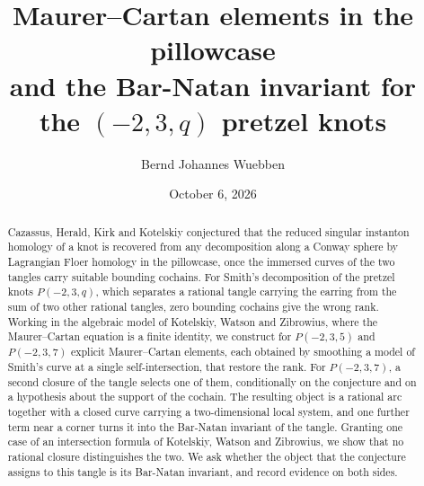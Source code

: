 \documentclass[11pt,reqno]{amsart}
\theoremstyle{plain}
\theoremstyle{definition}
\numberwithin{equation}{section}
\begin{document}
\title[Maurer--Cartan elements and the Bar-Natan invariant]
{Maurer--Cartan elements in the pillowcase\\ and the Bar-Natan invariant for the $(-2,3,q)$ pretzel knots}

\author{Bernd Johannes Wuebben}
\date{October 6, 2026}

\begin{abstract}
Cazassus, Herald, Kirk and Kotelskiy conjectured that the reduced singular instanton homology of a knot is
recovered from any decomposition along a Conway sphere by Lagrangian Floer homology in the pillowcase, once the
immersed curves of the two tangles carry suitable bounding cochains. For Smith's decomposition of the pretzel knots
$P(-2,3,q)$, which separates a rational tangle carrying the earring from the sum of two other rational tangles,
zero bounding cochains give the wrong rank. Working in the
algebraic model of Kotelskiy, Watson and Zibrowius, where the Maurer--Cartan equation is a finite identity, we
construct for $P(-2,3,5)$ and $P(-2,3,7)$ explicit Maurer--Cartan elements, each obtained by smoothing a model of
Smith's curve at a single self-intersection, that restore the rank. For $P(-2,3,7)$, a second closure of the tangle
selects one of them, conditionally on the conjecture and on a hypothesis about the support of the cochain. The
resulting object is a rational arc together with a closed curve carrying a two-dimensional local system, and one
further term near a corner turns it into the Bar-Natan invariant of the tangle. Granting one case of an
intersection formula of Kotelskiy, Watson and Zibrowius, we show that no rational closure distinguishes the two. We ask whether
the object that the conjecture assigns to this tangle is its Bar-Natan invariant, and record evidence on both
sides.
\end{abstract}

\maketitle






\appendix

\end{document}
